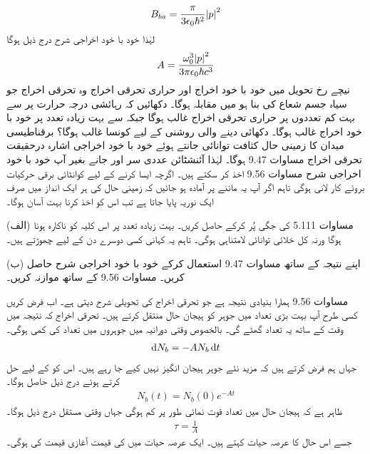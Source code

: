\begin{align}
	B_{ba} = \frac{\pi}{3\epsilon_0\hbar^2}\abs{p}^2
\end{align}
لہٰذا خود با خود اخراجی شرح درج ذیل ہوگا
\begin{align}
	A = \frac{\omega^3_0\abs{p}^2}{3\pi\epsilon_0\hbar c^3}
\end{align}
نیچے رخ تحویل میں خود با خود اخراج اور حراری تحرقی اخراج وہ تحرقی اخراج جو سیاہ جسم شعاع کی بنا ہو میں مقابلہ ہوگا۔ دکھائیں کہ رہائشی درجہ حرارت  پر  سے بہت کم تعددوں  پر حراری تحرقی اخراج غالب ہوگا جبکہ  سے بہت زیادہ تعدد پر خود با خود اخراج غالب ہوگا۔ دکھائی دینے والی روشنی کے لیے کونسا غالب ہوگا؟
برقناطیسی میدان کا زمینی حال کثافت توانائی  جانتے ہوئے خود با خود اخراجی اشارہ درحقیقت تحرقی اخراج مساوات \num{9.47} ہوگا۔ لہٰذا آئنشٹائن عددی سر  اور  جانے بغیر آپ خود با خود اخراجی شرح مساوات \num{9.56} اخذ  کر سکتے ہیں۔ اگرچہ ایسا کرنے کے لیے کوانٹائی برقی حرکیات بروئے کار لانی ہوگی تاہم اگر آپ یہ  ماننے  پر آمادہ ہو جائیں کہ زمینی حال کی ہر ایک انداز میں صرف ایک نوریہ پایا جاتا ہے تب اس کو اخذ کرنا بہت آسان ہوگا۔

(الف) مساوات \num{5.111} کی  جگی  پُر کرکے  حاصل کریں۔ بہت زیادہ تعدد پر اس کلیہ کو ناکارہ  ہونا ہوگا ورنہ کل خلائی توانائی لامتناہی ہوگی۔ تاہم یہ کہانی کسی دوسرے دن کے لیے چھوڑتے ہیں۔

(ب) اپنے نتیجہ کے ساتھ مساوات \num{9.47} استعمال کرکے خود با خود اخراجی شرح حاصل کریں۔ مساوات \num{9.56} کے ساتھ موازنہ کریں۔


مساوات \num{9.56} ہمارا بنیادی نتیجہ ہے جو تحرقی اخراج کی تحویلی شرح دیتی ہے۔ اب فرض کریں کسی طرح آپ بہت بڑی تعداد میں جوہر کو ہیجان حال منتقل کرتے ہیں۔ تحرقی اخراج کہ نتیجہ میں وقت کے ساتھ یہ تعداد گھٹے  گی۔ بالخصوص وقتی دورانیہ  میں جوہروں میں تعداد کی کمی  ہوگی۔
\begin{align}
	\dif N_b = -AN_b\dif t
\end{align}
جہاں ہم فرض کرتے ہیں کہ مزید نئے جوہر ہیجان انگیز نہیں کیے جا رہے ہیں۔ اس کو  کے لیے حل کرتے ہوئے درج ذیل حاصل ہوگا۔
\begin{align}
	N_b(t) = N_b(0)e^{-At}
\end{align}
ظاہر ہے کہ ہیجان حال میں تعداد قوت نمائی طور پر کم ہوگی جہاں وقتی مستقل درج ذیل ہوگا۔
\begin{align}
	\tau = \frac{1}{A}
\end{align}
جسے  اس حال کا عرصہ حیات کہتے ہیں۔ ایک عرصہ حیات میں  کی قیمت آغازی  قیمت کی  ہوگی۔

